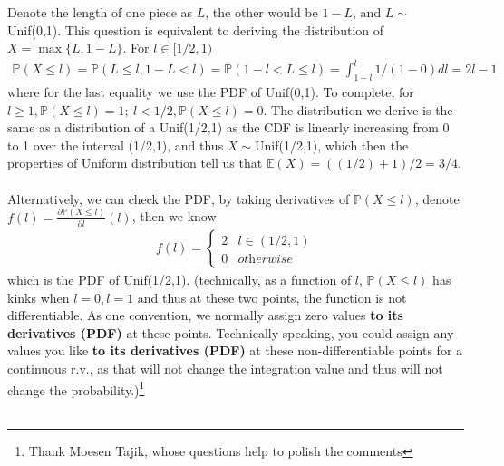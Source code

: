

\setcounter{theorem}{11}
\begin{exercise}[BH.5.12] 
\begin{solution}
    Denote the length of one piece as $L$, the other would be $1-L$, and $L\sim$Unif(0,1). This question is equivalent to deriving the distribution of $X=\max\{L,1-L\}$.
	For $l\in [1/2,1)$
	\begin{align*}
		\mathbb{P}(X\leq l)=\mathbb{P}(L\leq l, 1-L<l)=\mathbb{P}(1-l<L\leq l) = \int_{1-l}^l 1/(1-0) dl = 2l-1 
	\end{align*}
	where for the last equality we use the PDF of Unif(0,1). To complete, for $l\geq 1, \mathbb{P}(X\leq l)=1;~ l<1/2,  \mathbb{P}(X\leq l)=0$. 
	The distribution we derive is the same as a distribution of a Unif(1/2,1) as the CDF is linearly increasing from 0 to 1 over the interval (1/2,1), and thus  $X\sim$Unif(1/2,1), which then the properties of Uniform distribution tell us that $\mathbb{E}(X) = ((1/2)+1)/2 = 3/4$. \\~\\
	Alternatively, we can check the PDF, by taking derivatives of $\mathbb{P}(X\leq l)$, denote $f(l)= \frac{\partial \mathbb{P}(X\leq l)}{\partial l}(l)$, then we know 
	\begin{align}
		f(l)= \left\{\begin{matrix}
			2 & l\in (1/2,1) \\ 0 & \textit{otherwise}
		\end{matrix}  \right.
	\end{align} 
	which is the PDF of Unif(1/2,1).
	(technically, as a function of $l$, $\mathbb{P}(X\leq l)$ has kinks when $l=0, l=1$ and thus at these two points, the function is not differentiable. As one convention, we normally assign zero values \textbf{to its derivatives (PDF)} at these points. Technically speaking, you could assign any values you like \textbf{to its derivatives (PDF)} at these non-differentiable points for a continuous r.v., as that will not change the integration value and thus will not change the probability.)\footnote{Thank Moesen Tajik, whose questions help to polish the comments}\\~\\
	

\end{solution}
\end{exercise}
